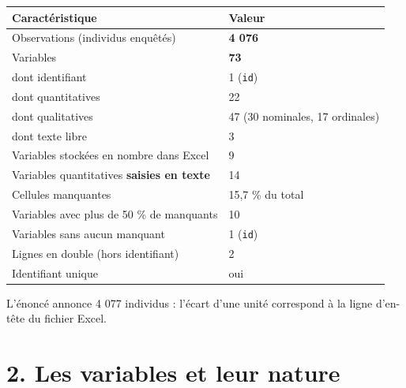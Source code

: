 \documentclass[

  french,

  10pt,

  a4paper,

]{article}
\newcounter{none} %
\begin{document}
{\def\LTcaptype{none} %

\begin{longtable}[]{@{}ll@{}}

\toprule\noalign{}

Caractéristique & Valeur \\

\midrule\noalign{}

\endhead

\bottomrule\noalign{}

\endlastfoot

Observations (individus enquêtés) & \textbf{4 076} \\

Variables & \textbf{73} \\

dont identifiant & 1 (\texttt{id}) \\

dont quantitatives & 22 \\

dont qualitatives & 47 (30 nominales, 17 ordinales) \\

dont texte libre & 3 \\

Variables stockées en nombre dans Excel & 9 \\

Variables quantitatives \textbf{saisies en texte} & 14 \\

Cellules manquantes & 15,7 \% du total \\

Variables avec plus de 50 \% de manquants & 10 \\

Variables sans aucun manquant & 1 (\texttt{id}) \\

Lignes en double (hors identifiant) & 2 \\

Identifiant unique & oui \\

\end{longtable}

}



L'énoncé annonce 4 077 individus : l'écart d'une unité correspond à la ligne d'en-tête du fichier Excel.



\section{2. Les variables et leur nature}
\end{document}
